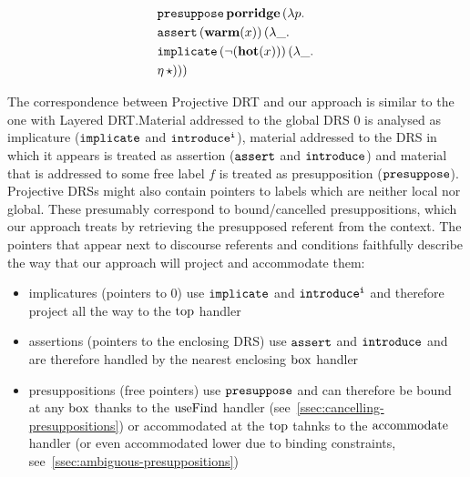 \vspace*{3mm}
\begin{minipage}{.4\textwidth}
{
  \begin{center}
  \let \drsalignment = l
  \end{center}
}
\end{minipage}
\begin{minipage}{.4\textwidth}
  \begin{center}
  \begin{align*}
    &\mathtt{presuppose}\,\textbf{porridge}\,(\lambda p.\,  \\
    &\mathtt{assert}\,(\textbf{warm}(x))\,(\lambda \_.\,  \\
    &\mathtt{implicate}\,(\lnot (\textbf{hot}(x)))\,(\lambda \_.\,  \\
    &\eta\,\star)))
  \end{align*}
  \end{center}
\end{minipage}
\vspace{5mm}

The correspondence between Projective DRT and our approach is similar to
the one with Layered DRT.\@ Material addressed to the global DRS $0$ is
analysed as implicature ($\mathtt{implicate}$ and $\mathtt{introduce^i}$), material
addressed to the DRS in which it appears is treated as assertion
($\mathtt{assert}$ and $\mathtt{introduce}$) and material that is addressed to some
free label $f$ is treated as presupposition ($\mathtt{presuppose}$). Projective
DRSs might also contain pointers to labels which are neither local nor
global. These presumably correspond to bound/cancelled presuppositions,
which our approach treats by retrieving the presupposed referent from the
context. The pointers that appear next to discourse referents and
conditions faithfully describe the way that our approach will project and
accommodate them:

\begin{itemize}
\item implicatures (pointers to $0$) use $\mathtt{implicate}$ and
  $\mathtt{introduce^i}$ and therefore project all the way to the $\operatorname{top}$
  handler
\item assertions (pointers to the enclosing DRS) use $\mathtt{assert}$ and
  $\mathtt{introduce}$ and are therefore handled by the nearest enclosing
  $\mathrm{box}$ handler
\item presuppositions (free pointers) use $\mathtt{presuppose}$ and can
  therefore be bound at any $\mathrm{box}$ thanks to the $\operatorname{useFind}$ handler
  (see~\ref{ssec:cancelling-presuppositions}) or accommodated at the $\operatorname{top}$
  tahnks to the $\operatorname{accommodate}$ handler (or even accommodated lower due to
  binding constraints, see~\ref{ssec:ambiguous-presuppositions})
\end{itemize}


